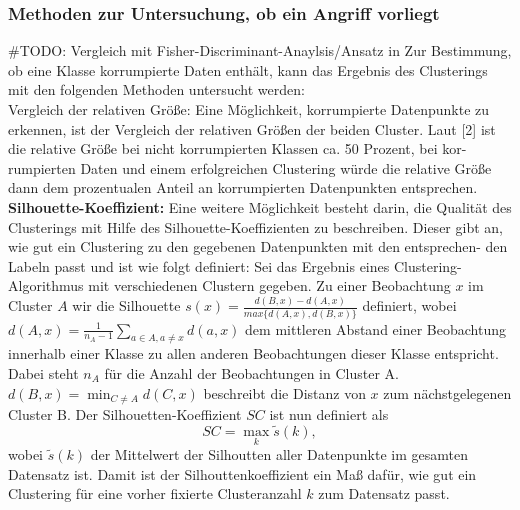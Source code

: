 \documentclass[11pt,a4paper]{article}
\numberwithin{equation}{section}
\begin{document}
		
		\subsubsection{Methoden zur Untersuchung, ob ein Angriff vorliegt}
		\#TODO: Vergleich mit Fisher-Discriminant-Anaylsis/Ansatz in \cite{imagenet_unhansed_v1}
		Zur
		Bestimmung, ob eine Klasse korrumpierte Daten enthält, kann das Ergebnis
		des Clusterings mit den folgenden Methoden untersucht werden:\\
		
		\noindent {}
		{Vergleich der relativen Größe:} Eine Möglichkeit, korrumpierte Datenpunkte
		zu erkennen, ist der Vergleich der relativen Größen der beiden Cluster. Laut [2]
		ist die relative Größe bei nicht korrumpierten Klassen ca. 50 Prozent, bei kor-
		rumpierten Daten und einem erfolgreichen Clustering würde die relative Größe
		dann dem prozentualen Anteil an korrumpierten Datenpunkten entsprechen.\\
		
		\noindent \textbf{Silhouette-Koeffizient:} Eine weitere Möglichkeit besteht darin, die Qualität
		des Clusterings mit Hilfe des Silhouette-Koeffizienten zu beschreiben. Dieser gibt
		an, wie gut ein Clustering zu den gegebenen Datenpunkten mit den entsprechen-
		den Labeln passt und ist wie folgt definiert: Sei das Ergebnis eines Clustering-
		Algorithmus mit verschiedenen Clustern gegeben. Zu einer Beobachtung $x$ im Cluster $A$ wir die Silhouette $s(x) = \frac{d(B,x)-d(A,x)}{max\lbrace d(A,x), d(B,x) \rbrace}$ definiert, wobei $d(A,x)  = \frac{1}{n_A -1}\sum_{a \in A, a \neq x}{d(a,x)}$ dem mittleren Abstand einer Beobachtung innerhalb einer Klasse zu allen anderen Beobachtungen dieser Klasse entspricht.
		Dabei steht $n_A$ für die Anzahl der Beobachtungen in Cluster A. $d(B,x) = \min_{C \neq A}d(C,x)$ beschreibt die Distanz von $x$ zum nächstgelegenen Cluster B. Der Silhouetten-Koeffizient $SC$ ist nun definiert als
		\begin{equation}
			SC = \max_k \tilde{s}(k),
		\end{equation}
		wobei $\tilde{s}(k)$ der Mittelwert der Silhoutten aller Datenpunkte im gesamten Datensatz ist. Damit ist der Silhouttenkoeffizient ein Maß dafür, wie gut ein Clustering für eine vorher fixierte Clusteranzahl $k$ zum Datensatz passt.\\
		
\end{document}
